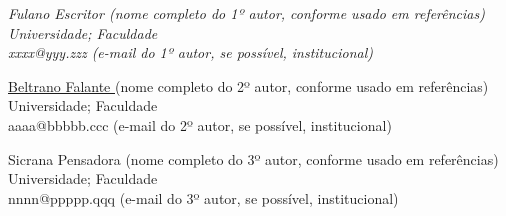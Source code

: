 \documentclass[a4paper,11pt]{article}
\begin{document}
\linenumbers %

\begin{flushright}{\it
\vspace*{5mm}
Fulano Escritor {\color{red}(nome completo do 1º autor, conforme usado em referências)}\\
Universidade; Faculdade\\
xxxx@yyy.zzz {\color{red}(e-mail do 1º autor, se possível, institucional)}

\vspace*{5mm}
\underline{Beltrano Falante }{\color{red}(nome completo do 2º autor, conforme usado em referências)}\\ %
Universidade; Faculdade\\
aaaa@bbbbb.ccc {\color{red}(e-mail do 2º autor, se possível, institucional)}

\vspace*{5mm}
Sicrana Pensadora {\color{red}(nome completo do 3º autor, conforme usado em referências)}\\
Universidade; Faculdade\\
nnnn@ppppp.qqq {\color{red}(e-mail do 3º autor, se possível, institucional)}
}\end{flushright}


\setcounter{equation}{0}
\end{document}
